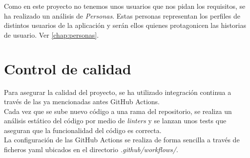 
Como en este proyecto no tenemos unos usuarios que nos pidan los requisitos, se ha realizado un análisis de \textit{Personas}\cite{personas}. Estas personas representan los perfiles de distintos usuarios de la aplicación y serán ellos quienes protagonicen las historias de usuario. Ver \autoref{chap:personas}.

\section{Control de calidad}
Para asegurar la calidad del proyecto, se ha utilizado integración continua a través de las ya mencionadas antes GitHub Actions.\\

Cada vez que se sube nuevo código a una rama del repositorio, se realiza un análisis estático del código por medio de \textit{linters} y se lanzan unos tests que aseguran que la funcionalidad del código es correcta.\\

La configuración de las GitHub Actions se realiza de forma sencilla a través de ficheros yaml ubicados en el directorio \textit{.github/workflows/}.\\



